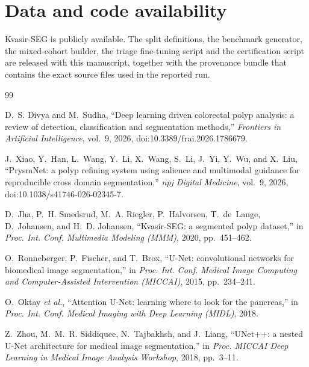 \documentclass[journal]{IEEEtran}
\begin{document}
\section*{Data and code availability}

Kvasir-SEG is publicly available. The split definitions, the benchmark generator, the mixed-cohort builder, the triage fine-tuning script and the certification script are released with this manuscript, together with the provenance bundle that contains the exact source files used in the reported run.

\begin{thebibliography}{99}

D.~S. Divya and M.~Sudha, ``Deep learning driven colorectal polyp analysis: a review of detection, classification and segmentation methods,'' \emph{Frontiers in Artificial Intelligence}, vol.~9, 2026, doi:10.3389/frai.2026.1786679.

J.~Xiao, Y.~Han, L.~Wang, Y.~Li, X.~Wang, S.~Li, J.~Yi, Y.~Wu, and X.~Liu, ``PrysmNet: a polyp refining system using salience and multimodal guidance for reproducible cross domain segmentation,'' \emph{npj Digital Medicine}, vol.~9, 2026, doi:10.1038/s41746-026-02345-7.

D.~Jha, P.~H. Smedsrud, M.~A. Riegler, P.~Halvorsen, T.~de~Lange, D.~Johansen, and H.~D. Johansen, ``Kvasir-SEG: a segmented polyp dataset,'' in \emph{Proc. Int. Conf. Multimedia Modeling (MMM)}, 2020, pp.~451--462.

O.~Ronneberger, P.~Fischer, and T.~Brox, ``U-Net: convolutional networks for biomedical image segmentation,'' in \emph{Proc. Int. Conf. Medical Image Computing and Computer-Assisted Intervention (MICCAI)}, 2015, pp.~234--241.

O.~Oktay \emph{et al.}, ``Attention U-Net: learning where to look for the pancreas,'' in \emph{Proc. Int. Conf. Medical Imaging with Deep Learning (MIDL)}, 2018.

Z.~Zhou, M.~M.~R. Siddiquee, N.~Tajbakhsh, and J.~Liang, ``UNet++: a nested U-Net architecture for medical image segmentation,'' in \emph{Proc. MICCAI Deep Learning in Medical Image Analysis Workshop}, 2018, pp.~3--11.


\end{thebibliography}
\end{document}
